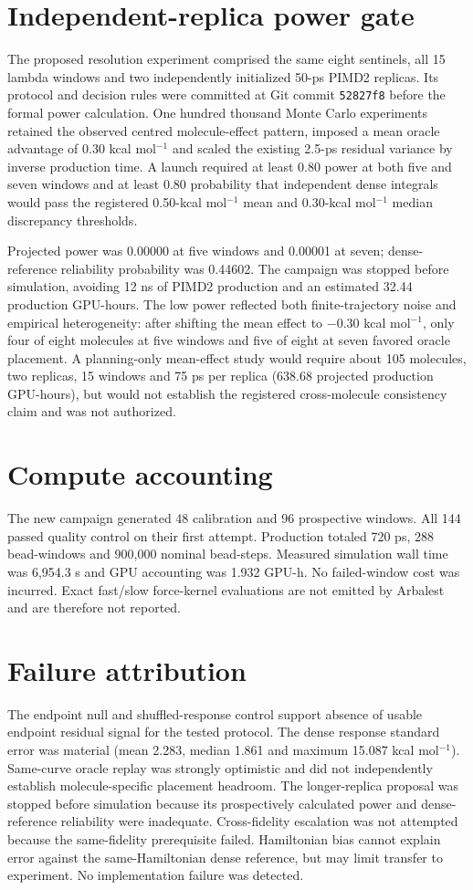 \documentclass[11pt]{article}
\begin{document}
\section{Independent-replica power gate}
The proposed resolution experiment comprised the same eight sentinels, all 15 lambda windows and two independently initialized 50-ps PIMD2 replicas. Its protocol and decision rules were committed at Git commit \texttt{52827f8} before the formal power calculation. One hundred thousand Monte Carlo experiments retained the observed centred molecule-effect pattern, imposed a mean oracle advantage of 0.30 kcal mol$^{-1}$ and scaled the existing 2.5-ps residual variance by inverse production time. A launch required at least 0.80 power at both five and seven windows and at least 0.80 probability that independent dense integrals would pass the registered 0.50-kcal mol$^{-1}$ mean and 0.30-kcal mol$^{-1}$ median discrepancy thresholds.

Projected power was 0.00000 at five windows and 0.00001 at seven; dense-reference reliability probability was 0.44602. The campaign was stopped before simulation, avoiding 12 ns of PIMD2 production and an estimated 32.44 production GPU-hours. The low power reflected both finite-trajectory noise and empirical heterogeneity: after shifting the mean effect to $-0.30$ kcal mol$^{-1}$, only four of eight molecules at five windows and five of eight at seven favored oracle placement. A planning-only mean-effect study would require about 105 molecules, two replicas, 15 windows and 75 ps per replica (638.68 projected production GPU-hours), but would not establish the registered cross-molecule consistency claim and was not authorized.

\section{Compute accounting}
The new campaign generated 48 calibration and 96 prospective windows. All 144 passed quality control on their first attempt. Production totaled 720 ps, 288 bead-windows and 900,000 nominal bead-steps. Measured simulation wall time was 6,954.3 s and GPU accounting was 1.932 GPU-h. No failed-window cost was incurred. Exact fast/slow force-kernel evaluations are not emitted by Arbalest and are therefore not reported.

\section{Failure attribution}
The endpoint null and shuffled-response control support absence of usable endpoint residual signal for the tested protocol. The dense response standard error was material (mean 2.283, median 1.861 and maximum 15.087 kcal mol$^{-1}$). Same-curve oracle replay was strongly optimistic and did not independently establish molecule-specific placement headroom. The longer-replica proposal was stopped before simulation because its prospectively calculated power and dense-reference reliability were inadequate. Cross-fidelity escalation was not attempted because the same-fidelity prerequisite failed. Hamiltonian bias cannot explain error against the same-Hamiltonian dense reference, but may limit transfer to experiment. No implementation failure was detected.
\end{document}
